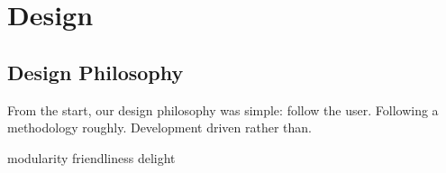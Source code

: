 \chapter{Design}

\section{Design Philosophy}\label{design-philosophy}

From the start, our design philosophy was simple: follow the user.
Following a methodology roughly. Development driven rather than.

modularity friendliness delight
